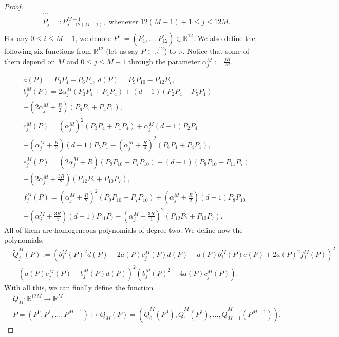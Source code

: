 \documentclass{amsart}
\theoremstyle{definition}
\theoremstyle{remark}
\newcommand{\al}{\alpha}
\renewcommand\leq\leqslant
\numberwithin{equation}{section}
\theoremstyle{definition}
\theoremstyle{remark}
\begin{document}
\begin{proof}
\begin{equation}
\begin{aligned}
            &\ldots\\
            &P_{j}=:P^{M-1}_{j-12(M-1)},\text{ whenever }12(M-1)+1\leq j\leq 12M.\\
             \end{aligned}
	\end{equation}For any $0\leq i\leq M-1$, we denote $P^i:=\left(P^i_1,\ldots,P^i_{12}\right)\in\mathbb{R}^{12}.$ We also define the following six functions from $\mathbb{R}^{12}$ (let us say $P\in\mathbb{R}^{12}$) to $\mathbb{R}$. Notice that some of them depend on $M$ and $0\leq j\leq M-1$ through the parameter $\al_j^M:=\frac{jR}{M}$.
    
	\begin{equation}
    \begin{aligned}
        &a(P)=P_{3}P_{4}-P_{6}P_{1},\ d(P)=P_{9}P_{10}-P_{12}P_{7},\\ 
        &b^M_j(P)=2\al_j^M(P_{3}P_{4}+P_{1}P_{4})+(d-1)(P_{2}P_{4}-P_{5}P_{1})\\&-\left(2\al_j^M+\frac{R}{2}\right)(P_{6}P_{1}+P_{4}P_{1}),\\
        &c^M_j(P)=(\al_j^M)^2(P_{3}P_{4}+P_{1}P_{4})+\al_j^M(d-1)P_{2}P_{4}\\
        &-\left(\al_j^M+\frac{R}{2}\right)(d-1)P_{5}P_{1}-\left(\al_j^M+\frac{R}{4}\right)^2(P_{6}P_{1}+P_{4}P_{1}),\\
        &e^M_j(P)=\left(2\al_j^M+R\right)(P_{9}P_{10}+P_{7}P_{10})+(d-1)(P_{8}P_{10}-P_{11}P_{7})\\
        &-\left(2\al_j^M+\frac{3R}{2}\right)(P_{12}P_{7}+P_{10}P_{7}),\\
        &f^M_j(P)=\left(\al_j^M+\frac{R}{2}\right)^2(P_{9}P_{10}+P_{7}P_{10})+\left(\al_j^M+\frac{R}{2}\right)(d-1)P_{8}P_{10}\\
        &-\left(\al_j^M+\frac{3R}{4}\right)(d-1)P_{11}P_{7}-\left(\al_j^M+\frac{3R}{4}\right)^2(P_{12}P_{7}+P_{10}P_{7}).
    \end{aligned}
\end{equation}All of them are homogeneous polynomials of degree two.
	We define now the polynomials:\begin{equation}
    \begin{aligned}
        &\tilde{Q}^M_j(P):=\left(b^M_j(P)^2d(P)-2a(P)c^M_j(P)d(P)-a(P)b^M_j(P)e(P)+2a(P)^2f^M_j(P)\right)^2\\
        &-\left(a(P)e^M_j(P)-b^M_j(P)d(P)\right)^2\left(b^M_j(P)^2-4a(P)c^M_j(P)\right).
    \end{aligned}
\end{equation}
    With all this, we can finally define the function\begin{equation}
        \begin{aligned}
            &Q_M:\mathbb{R}^{12M}\rightarrow\mathbb{R}^{M}\\
            &P=(P^0,P^1,\ldots,P^{M-1})\mapsto Q_M(P)=\left(\tilde{Q}^M_0\left(P^0\right), \tilde{Q}^M_1\left(P^1\right),\ldots,\tilde{Q}^M_{M-1}\left(P^{M-1}\right)\right).
        \end{aligned}
    \end{equation}
	 

\end{proof}
\end{document}
